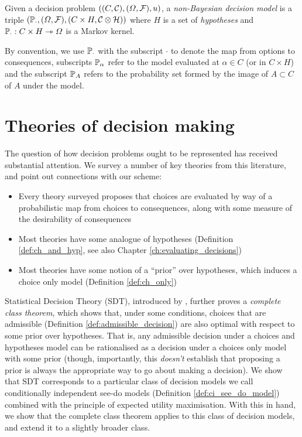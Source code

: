 \begin{definition}\label{def:ch_and_hyp}
Given a decision problem $((C,\mathcal{C}),(\Omega,\mathcal{F}),u)$, a \emph{non-Bayesian decision model} is a triple $(\mathbb{P}_\cdot,(\Omega,\mathcal{F}),(C\times H,\mathcal{C}\otimes\mathcal{H}))$ where $H$ is a set of \emph{hypotheses} and $\mathbb{P}_\cdot:C\times H\rightarrowtriangle \Omega$ is a Markov kernel.
\end{definition}

By convention, we use $\mathbb{P}_\cdot$ with the subscript $\cdot$ to denote the map from options to consequences, subscripts $\mathbb{P}_\alpha$ refer to the model evaluated at $\alpha\in C$ (or in $C\times H$) and the subscript $\mathbb{P}_{A}$ refers to the probability set formed by the image of $A\subset C$ of $A$ under the model.

\section{Theories of decision making}\label{sec:how_represent_conseqeunces}

The question of how decision problems ought to be represented has received substantial attention. We survey a number of key theories from this literature, and point out connections with our scheme:
\begin{itemize}
    \item Every theory surveyed proposes that choices are evaluated by way of a probabilistic map from choices to consequences, along with some measure of the desirability of consequences
    \item Most theories have some analogue of hypotheses (Definition \ref{def:ch_and_hyp}, see also Chapter \ref{ch:evaluating_decisions})
    \item Most theories have some notion of a ``prior'' over hypotheses, which induces a choice only model (Definition \ref{def:ch_only})
\end{itemize}

Statistical Decision Theory (SDT), introduced by \citet{wald_statistical_1950}, further proves a \emph{complete class theorem}, which shows that, under some conditions, choices that are admissible (Definition \ref{def:admissible_decision}) are also optimal with respect to some prior over hypotheses. That is, any admissible decision under a choices and hypotheses model can be rationalised as a decision under a choices only model with some prior (though, importantly, this \emph{doesn't} establish that proposing a prior is always the appropriate way to go about making a decision). We show that SDT corresponds to a particular class of decision models we call conditionally independent see-do models (Definition \ref{def:ci_see_do_model}) combined with the principle of expected utility maximisation. With this in hand, we show that the complete class theorem applies to this class of decision models, and extend it to a slightly broader class.

